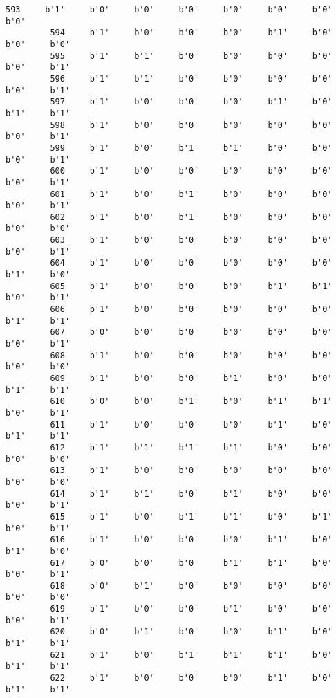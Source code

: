 \documentclass[11pt]{article}
\begin{document}
\begin{Verbatim}[commandchars=\\\{\}]
         593     b'1'     b'0'     b'0'     b'0'     b'0'     b'0'     b'0'     b'0'   
         594     b'1'     b'0'     b'0'     b'0'     b'1'     b'0'     b'0'     b'0'   
         595     b'1'     b'1'     b'0'     b'0'     b'0'     b'0'     b'0'     b'1'   
         596     b'1'     b'1'     b'0'     b'0'     b'0'     b'0'     b'0'     b'1'   
         597     b'1'     b'0'     b'0'     b'0'     b'1'     b'0'     b'1'     b'1'   
         598     b'1'     b'0'     b'0'     b'0'     b'0'     b'0'     b'0'     b'1'   
         599     b'1'     b'0'     b'1'     b'1'     b'0'     b'0'     b'0'     b'1'   
         600     b'1'     b'0'     b'0'     b'0'     b'0'     b'0'     b'0'     b'1'   
         601     b'1'     b'0'     b'1'     b'0'     b'0'     b'0'     b'0'     b'1'   
         602     b'1'     b'0'     b'1'     b'0'     b'0'     b'0'     b'0'     b'0'   
         603     b'1'     b'0'     b'0'     b'0'     b'0'     b'0'     b'0'     b'1'   
         604     b'1'     b'0'     b'0'     b'0'     b'0'     b'0'     b'1'     b'0'   
         605     b'1'     b'0'     b'0'     b'0'     b'1'     b'1'     b'0'     b'1'   
         606     b'1'     b'0'     b'0'     b'0'     b'0'     b'0'     b'1'     b'1'   
         607     b'0'     b'0'     b'0'     b'0'     b'0'     b'0'     b'0'     b'1'   
         608     b'1'     b'0'     b'0'     b'0'     b'0'     b'0'     b'0'     b'0'   
         609     b'1'     b'0'     b'0'     b'1'     b'0'     b'0'     b'1'     b'1'   
         610     b'0'     b'0'     b'1'     b'0'     b'1'     b'1'     b'0'     b'1'   
         611     b'1'     b'0'     b'0'     b'0'     b'1'     b'0'     b'1'     b'1'   
         612     b'1'     b'1'     b'1'     b'1'     b'0'     b'0'     b'0'     b'0'   
         613     b'1'     b'0'     b'0'     b'0'     b'0'     b'0'     b'0'     b'0'   
         614     b'1'     b'1'     b'0'     b'1'     b'0'     b'0'     b'0'     b'1'   
         615     b'1'     b'0'     b'1'     b'1'     b'0'     b'1'     b'0'     b'1'   
         616     b'1'     b'0'     b'0'     b'0'     b'1'     b'0'     b'1'     b'0'   
         617     b'0'     b'0'     b'0'     b'1'     b'1'     b'0'     b'0'     b'1'   
         618     b'0'     b'1'     b'0'     b'0'     b'0'     b'0'     b'0'     b'0'   
         619     b'1'     b'0'     b'0'     b'1'     b'0'     b'0'     b'0'     b'1'   
         620     b'0'     b'1'     b'0'     b'0'     b'1'     b'0'     b'1'     b'1'   
         621     b'1'     b'0'     b'1'     b'1'     b'1'     b'0'     b'1'     b'1'   
         622     b'1'     b'0'     b'0'     b'0'     b'1'     b'0'     b'1'     b'1'   

\end{Verbatim}
\end{document}

